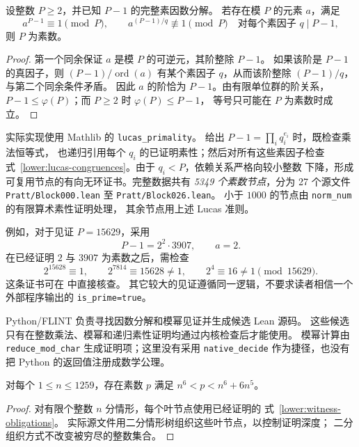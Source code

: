 \begin{lemma}\label{lower:lucas}
设整数 $P\geq2$，并已知 $P-1$ 的完整素因数分解。
若存在模 $P$ 的元素 $a$，满足
\begin{equation}\label{lower:lucas-congruences}
 a^{P-1}\equiv1\pmod P,
 \qquad
 a^{(P-1)/q}\not\equiv1\pmod P
 \quad\text{对每个素因子 }q\mid P-1,
\end{equation}
则 $P$ 为素数。
\end{lemma}

\begin{proof}
第一个同余保证 $a$ 是模 $P$ 的可逆元，其阶整除 $P-1$。
如果该阶是 $P-1$ 的真因子，则 $(P-1)/\operatorname{ord}(a)$
有某个素因子 $q$，从而该阶整除 $(P-1)/q$，与第二个同余条件矛盾。
因此 $a$ 的阶恰为 $P-1$。由有限单位群的阶关系，
$P-1\leq\varphi(P)$；而 $P\geq2$ 时 $\varphi(P)\leq P-1$，
等号只可能在 $P$ 为素数时成立。
\end{proof}

实际实现使用 Mathlib 的 \texttt{lucas\_primality}。
给出 $P-1=\prod_iq_i^{e_i}$ 时，既检查乘法恒等式，
也递归引用每个 $q_i$ 的已证明素性；然后对所有这些素因子检查
式~\eqref{lower:lucas-congruences}。由于 $q_i<P$，依赖关系严格向较小整数
下降，形成可复用节点的有向无环证书。完整数据共有
\emph{5349 个素数节点}，分为 27 个源文件
\texttt{Pratt/Block000.lean} 至 \texttt{Pratt/Block026.lean}。
小于 $1000$ 的节点由 \texttt{norm\_num} 的有限算术素性证明处理，
其余节点用上述 Lucas 准则。

例如，对于见证 $P=15629$，采用
\[
 P-1=2^2\cdot3907,\qquad a=2.
\]
在已经证明 $2$ 与 $3907$ 为素数之后，需检查
\[
 2^{15628}\equiv1,\qquad
 2^{7814}\equiv15628\ne1,\qquad
 2^4\equiv16\ne1\pmod{15629}.
\]
这条证书可在  中直接核查。
其它较大的见证遵循同一逻辑，不要求读者相信一个外部程序输出的
\texttt{is\_prime=true}。

Python/FLINT 负责寻找因数分解和模幂见证并生成候选 Lean 源码。
这些候选只有在整数乘法、模幂和递归素性证明均通过内核检查后才能使用。
模幂计算由 \texttt{reduce\_mod\_char} 生成证明项；这里没有采用
\texttt{native\_decide} 作为捷径，也没有把 Python 的返回值注册成数学公理。

\begin{proposition}[小整数范围]\label{lower:small}
对每个 $1\leq n\leq1259$，存在素数 $p$ 满足
$n^6<p<n^6+6n^5$。
\end{proposition}

\begin{proof}
对有限个整数 $n$ 分情形，每个叶节点使用已经证明的
式~\eqref{lower:witness-obligations}。
实际源文件用二分情形树组织这些叶节点，以控制证明深度；
二分组织方式不改变被穷尽的整数集合。
\end{proof}

